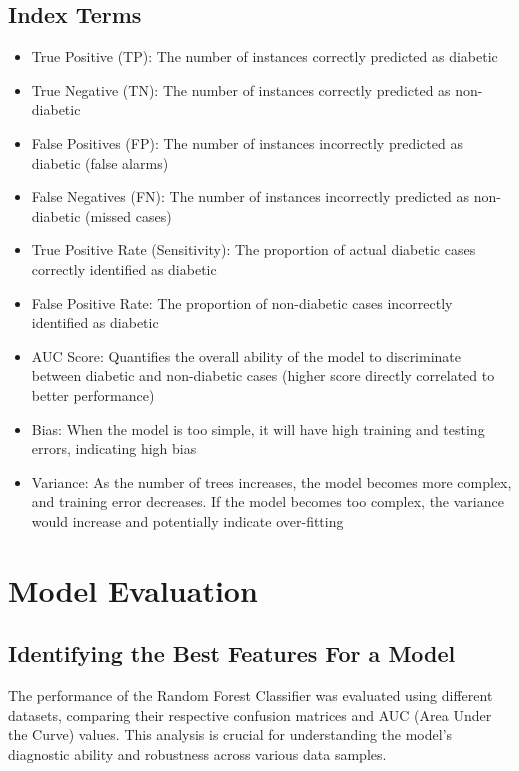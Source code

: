 \documentclass[journal]{IEEEtran}
\begin{document}
\normalsize
\subsection{Index Terms}
\begin{itemize}
\item True Positive (TP): The number of instances correctly predicted as diabetic
\item True Negative (TN): The number of instances correctly predicted as non-diabetic 
\item False Positives (FP): The number of instances incorrectly predicted as diabetic (false alarms)
\item False Negatives (FN): The number of instances incorrectly predicted as non-diabetic (missed cases)
\item True Positive Rate (Sensitivity): The proportion of actual diabetic cases correctly identified as diabetic
\item False Positive Rate: The proportion of non-diabetic cases incorrectly identified as diabetic
\item AUC Score: Quantifies the overall ability of the model to discriminate between diabetic and non-diabetic cases (higher score directly correlated to better performance)
\item Bias: When the model is too simple, it will have high training and testing errors, indicating high bias
\item Variance: As the number of trees increases, the model becomes more complex, and training error decreases. If the model becomes too complex, the variance would increase and potentially indicate over-fitting
\end{itemize}

\section{Model Evaluation}

\subsection{Identifying the Best Features For a Model}

The performance of the Random Forest Classifier was evaluated using different datasets, comparing their respective confusion matrices and AUC (Area Under the Curve) values. This analysis is crucial for understanding the model's diagnostic ability and robustness across various data samples.
\end{document}
